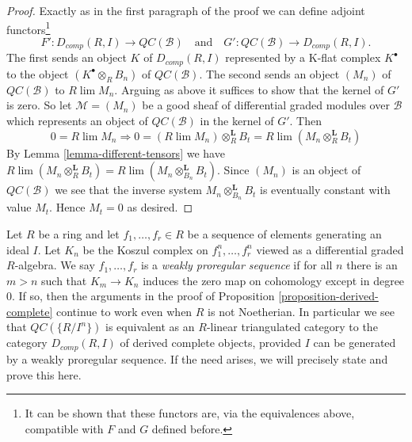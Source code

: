 \begin{proof}
\medskip\noindent
Exactly as in the first paragraph of the proof we can define
adjoint functors\footnote{It can be shown that these functors are,
via the equivalences above, compatible with $F$ and $G$ defined before.}
$$
F' : D_{comp}(R, I) \longrightarrow \mathit{QC}(\mathcal{B})
\quad\text{and}\quad
G' : \mathit{QC}(\mathcal{B}) \longrightarrow D_{comp}(R, I).
$$
The first sends an object $K$ of $D_{comp}(R, I)$ represented by a
K-flat complex $K^\bullet$ to the object $(K^\bullet \otimes_R B_n)$
of $\mathit{QC}(\mathcal{B})$. The second sends an object
$(M_n)$ of $\mathit{QC}(\mathcal{B})$ to $R\lim M_n$.
Arguing as above it suffices to show that the kernel of $G'$ is zero.
So let $\mathcal{M} = (M_n)$ be a good sheaf of differential graded
modules over $\mathcal{B}$ which represents an object of
$\mathit{QC}(\mathcal{B})$ in the kernel of $G'$. Then
$$
0 = R\lim M_n \Rightarrow
0 = (R\lim M_n) \otimes_R^\mathbf{L} B_t =
R\lim (M_n \otimes_R^\mathbf{L} B_t)
$$
By Lemma \ref{lemma-different-tensors} we have
$R\lim (M_n \otimes_R^\mathbf{L} B_t) =
R\lim (M_n \otimes_{B_n}^\mathbf{L} B_t)$.
Since $(M_n)$ is an object of $\mathit{QC}(\mathcal{B})$ we
see that the inverse system $M_n \otimes_{B_n}^\mathbf{L} B_t$
is eventually constant with value $M_t$. Hence $M_t = 0$ as desired.
\end{proof}

\begin{remark}
\label{remark-proregular}
Let $R$ be a ring and let $f_1, \ldots, f_r \in R$ be a sequence of elements
generating an ideal $I$. Let $K_n$ be the Koszul complex on
$f_1^n, \ldots, f_r^n$ viewed as a differential graded $R$-algebra.
We say $f_1, \ldots, f_r$ is a {\it weakly proregular sequence}
if for all $n$ there is an $m > n$ such that $K_m \to K_n$
induces the zero map on cohomology except in degree $0$. If so, then
the arguments in the proof of Proposition \ref{proposition-derived-complete}
continue to work even when $R$ is not Noetherian.
In particular we see that $\mathit{QC}(\{R/I^n\})$
is equivalent as an $R$-linear triangulated category
to the category $D_{comp}(R, I)$ of derived complete objects, provided
$I$ can be generated by a weakly proregular sequence.
If the need arises, we will precisely state and prove this here.
\end{remark}














